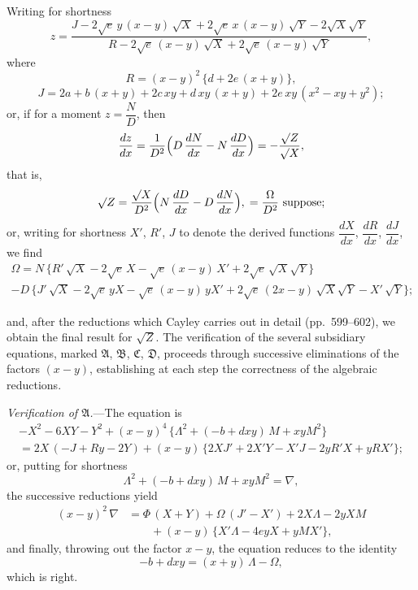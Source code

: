 \documentclass[11pt,a4paper]{book}
\begin{document}
\newpage

\noindent
Writing for shortness
\[
z = \frac{J - 2\surd e\,y\,(x-y)\,\surd X + 2\surd e\,x\,(x-y)\,\surd Y - 2\surd X\surd Y}{R - 2\surd e\,(x-y)\,\surd X + 2\surd e\,(x-y)\,\surd Y},
\]
where
\[
R = (x-y)^2\,\{d + 2e\,(x+y)\},
\]
\[
J = 2a + b\,(x+y) + 2c\,xy + d\,xy\,(x+y) + 2e\,xy\,(x^2-xy+y^2);
\]
or, if for a moment $z = \dfrac{N}{D}$, then
\[
\frac{dz}{dx} = \frac{1}{D^2}\Bigl(D\,\frac{dN}{dx} - N\,\frac{dD}{dx}\Bigr) = -\frac{\surd Z}{\surd X},
\]
that is,
\[
\surd Z = \frac{\surd X}{D^2}\Bigl(N\,\frac{dD}{dx} - D\,\frac{dN}{dx}\Bigr),\; = \frac{\Omega}{D^2} \text{ suppose};
\]
or, writing for shortness $X'$, $R'$, $J$ to denote the derived functions $\dfrac{dX}{dx}$, $\dfrac{dR}{dx}$, $\dfrac{dJ}{dx}$, we find
\begin{multline*}
\Omega = N\,\{R'\,\surd X - 2\surd e\,X - \surd e\,(x-y)\,X' + 2\surd e\,\surd X\surd Y\} \\
- D\,\{J'\,\surd X - 2\surd e\,yX - \surd e\,(x-y)\,yX' + 2\surd e\,(2x-y)\,\surd X\surd Y - X'\,\surd Y\};
\end{multline*}

and, after the reductions which Cayley carries out in detail (pp.~599--602), we obtain the final result for $\surd Z$. The verification of the several subsidiary equations, marked $\mathfrak{A}$, $\mathfrak{B}$, $\mathfrak{C}$, $\mathfrak{D}$, proceeds through successive eliminations of the factors $(x-y)$, establishing at each step the correctness of the algebraic reductions.

\vspace{2ex}
\textit{Verification of $\mathfrak{A}$.}---The equation is
\begin{align*}
-X^2 - 6XY - Y^2 + (x-y)^4\,\{\Lambda^2 + (-b+dxy)\,M + xyM^2\} \\
= 2X\,(-J+Ry-2Y) + (x-y)\,\{2XJ' + 2X'Y - X'J - 2yR'X + yRX'\};
\end{align*}
or, putting for shortness
\[
\Lambda^2 + (-b+dxy)\,M + xyM^2 = \nabla,
\]
the successive reductions yield
\begin{align*}
(x-y)^2\,\nabla &= \Phi\,(X+Y) + \Omega\,(J'-X') + 2X\Lambda - 2yXM \\
&\qquad + (x-y)\,\{X'\Lambda - 4eyX + yMX'\},
\end{align*}
and finally, throwing out the factor $x-y$, the equation reduces to the identity
\[
-b + dxy = (x+y)\,\Lambda - \Omega,
\]
which is right.
\end{document}

